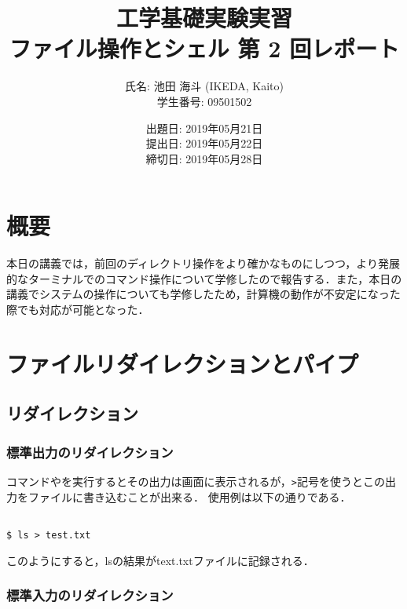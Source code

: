 \documentclass[a4j,11pt]{jarticle}
\title{工学基礎実験実習 \\
       ファイル操作とシェル 第 2 回レポート}
\author{氏名: 池田 海斗 (IKEDA, Kaito) \\
        学生番号: 09501502}
\date{出題日: 2019年05月21日 \\
      提出日: 2019年05月22日 \\
      締切日: 2019年05月28日 \\}
\begin{document}
\maketitle



\section{概要} %
本日の講義では，前回のディレクトリ操作をより確かなものにしつつ，より発展的なターミナルでのコマンド操作について学修したので報告する．また，本日の講義でシステムの操作についても学修したため，計算機の動作が不安定になった際でも対応が可能となった．



\section{ファイルリダイレクションとパイプ} %

\subsection{リダイレクション}
\vspace{\baselineskip}


\subsubsection{標準出力のリダイレクション}

コマンドやを実行するとその出力は画面に表示されるが，\verb|>|記号を使うとこの出力をファイルに書き込むことが出来る．
使用例は以下の通りである．

\begin{verbatim}

$ ls > test.txt

\end{verbatim}

このようにすると，lsの結果がtext.txtファイルに記録される．


\subsubsection{標準入力のリダイレクション}
\end{document}
